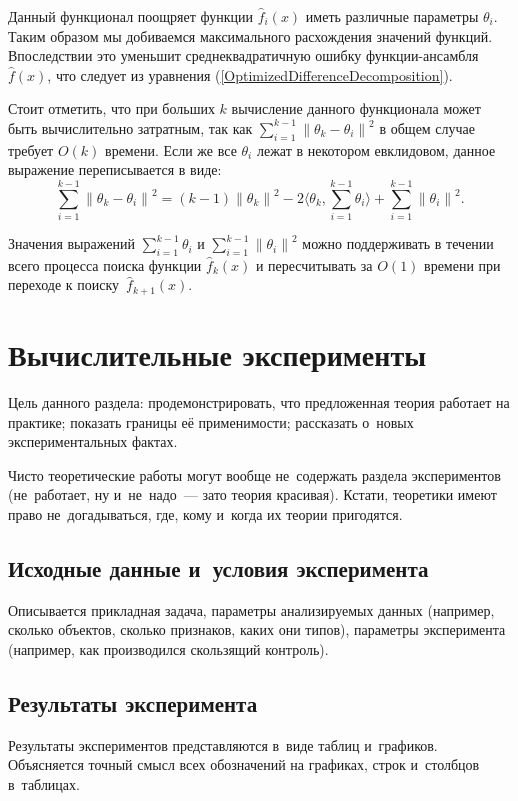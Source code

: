 \documentclass[12pt, fleqn]{article}
\newcommand{\norm}[1]{\left\lVert#1\right\rVert}
\newcommand{\scalarproduct}[1]{\langle #1 \rangle}
\newcommand{\predictionfunction}{\hat{f}}
\newcommand{\for}[3]{\sum\limits_{#1 = #2}^{#3}}  %
\newcommand{\forn}[2]{\for{#1}{1}{#2}}  %
\newcommand{\reference}[1]{(\ref{#1})}
\begin{document}
Данный функционал поощряет функции $\predictionfunction_i(x)$ иметь различные параметры $\theta_i$. Таким образом мы добиваемся максимального расхождения значений функций. Впоследствии это уменьшит среднеквадратичную ошибку функции-ансамбля $\predictionfunction(x)$, что следует из уравнения \reference{OptimizedDifferenceDecomposition}.

Стоит отметить, что при больших $k$ вычисление данного функционала может быть вычислительно затратным, так как $\forn{i}{k - 1}\norm{\theta_k - \theta_i}^2$ в общем случае требует $O(k)$ времени. Если же все $\theta_i$ лежат в некотором евклидовом, данное выражение переписывается в виде:
$$
\forn{i}{k - 1}\norm{\theta_k - \theta_i}^2 = (k - 1)\norm{\theta_k}^2 - 2\scalarproduct{\theta_k, \forn{i}{k - 1} \theta_i} + \forn{i}{k - 1}\norm{\theta_i}^2.
$$

Значения выражений $\forn{i}{k - 1} \theta_i$ и $\forn{i}{k - 1}\norm{\theta_i}^2$ можно поддерживать в течении всего процесса поиска функции $\predictionfunction_k(x)$ и пересчитывать за $O(1)$ времени при переходе к поиску~$\predictionfunction_{k+1}(x)$.

\section{Вычислительные эксперименты}

Цель данного раздела:
продемонстрировать, что предложенная теория работает на практике;
показать границы её применимости;
рассказать о~новых экспериментальных фактах.

Чисто теоретические работы могут вообще не~содержать раздела экспериментов
(не~работает, ну и~не~надо~--- зато теория красивая).
Кстати, теоретики имеют право не~догадываться, где, кому и~когда их теории пригодятся.

\subsection{Исходные данные и~условия эксперимента}
Описывается прикладная задача, параметры анализируемых данных 
(например, сколько объектов, сколько признаков, каких они типов), 
параметры эксперимента 
(например, как производился скользящий контроль). 

\subsection{Результаты эксперимента}
Результаты экспериментов представляются в~виде таблиц и~графиков. 
Объясняется точный смысл всех обозначений на графиках, строк и~столбцов в~таблицах. 
\end{document}
